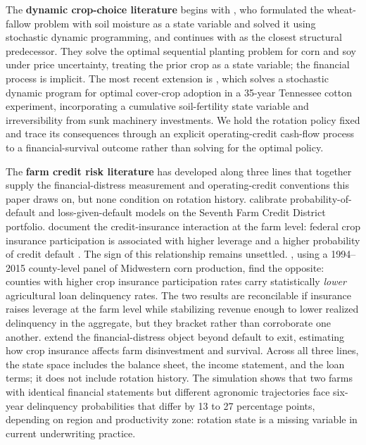 \documentclass[11pt,letterpaper]{article}
\theoremstyle{remark}
\begin{document}
The \textbf{dynamic crop-choice literature} begins with \citet{Burt1963}, who formulated the wheat-fallow problem with soil moisture as a state variable and solved it using stochastic dynamic programming, and continues with \citet{Livingston2015} as the closest structural predecessor. They solve the optimal sequential planting problem for corn and soy under price uncertainty, treating the prior crop as a state variable; the financial process is implicit. The most recent extension is \citet{Chen2025}, which solves a stochastic dynamic program for optimal cover-crop adoption in a 35-year Tennessee cotton experiment, incorporating a cumulative soil-fertility state variable and irreversibility from sunk machinery investments. We hold the rotation policy fixed and trace its consequences through an explicit operating-credit cash-flow process to a financial-survival outcome rather than solving for the optimal policy.
 
The \textbf{farm credit risk literature} has developed along three lines that together supply the financial-distress measurement and operating-credit conventions this paper draws on, but none condition on rotation history. \citet{Featherstone2006} calibrate probability-of-default and loss-given-default models on the Seventh Farm Credit District portfolio. \citet{IfftKuethe2013} document the credit-insurance interaction at the farm level: federal crop insurance participation is associated with higher leverage \citep{Ifft2015} and a higher probability of credit default \citep{IfftKuethe2013}. The sign of this relationship remains unsettled. \citet{LeeEtAl2024}, using a 1994--2015 county-level panel of Midwestern corn production, find the opposite: counties with higher crop insurance participation rates carry statistically \textit{lower} agricultural loan delinquency rates. The two results are reconcilable if insurance raises leverage at the farm level while stabilizing revenue enough to lower realized delinquency in the aggregate, but they bracket rather than corroborate one another. \citet{Kim2020} extend the financial-distress object beyond default to exit, estimating how crop insurance affects farm disinvestment and survival. Across all three lines, the state space includes the balance sheet, the income statement, and the loan terms; it does not include rotation history. The simulation shows that two farms with identical financial statements but different agronomic trajectories face six-year delinquency probabilities that differ by 13 to 27 percentage points, depending on region and productivity zone: rotation state is a missing variable in current underwriting practice.
 
\end{document}
